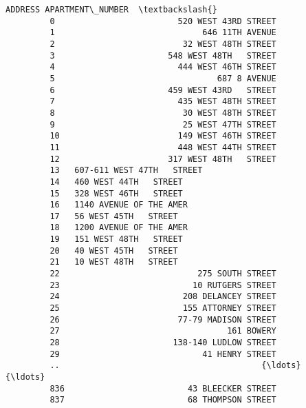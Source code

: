 \documentclass[11pt]{article}
\begin{document}
\begin{Verbatim}[commandchars=\\\{\}]
                                                ADDRESS APARTMENT\_NUMBER  \textbackslash{}
         0                         520 WEST 43RD STREET                    
         1                              646 11TH AVENUE                    
         2                          32 WEST 48TH STREET                    
         3                       548 WEST 48TH   STREET                    
         4                         444 WEST 46TH STREET                    
         5                                 687 8 AVENUE                    
         6                       459 WEST 43RD   STREET                    
         7                         435 WEST 48TH STREET                    
         8                          30 WEST 48TH STREET                    
         9                          25 WEST 47TH STREET                    
         10                        149 WEST 46TH STREET                    
         11                        448 WEST 44TH STREET                    
         12                      317 WEST 48TH   STREET                    
         13   607-611 WEST 47TH   STREET                                   
         14   460 WEST 44TH   STREET                                       
         15   328 WEST 46TH   STREET                                       
         16   1140 AVENUE OF THE AMER                                      
         17   56 WEST 45TH   STREET                                        
         18   1200 AVENUE OF THE AMER                                      
         19   151 WEST 48TH   STREET                                       
         20   40 WEST 45TH   STREET                                        
         21   10 WEST 48TH   STREET                                        
         22                            275 SOUTH STREET                    
         23                           10 RUTGERS STREET                    
         24                         208 DELANCEY STREET                    
         25                         155 ATTORNEY STREET                    
         26                        77-79 MADISON STREET                    
         27                                  161 BOWERY                    
         28                       138-140 LUDLOW STREET                    
         29                             41 HENRY STREET                    
         ..                                         {\ldots}              {\ldots}   
         836                         43 BLEECKER STREET                    
         837                         68 THOMPSON STREET                    

\end{Verbatim}
\end{document}
